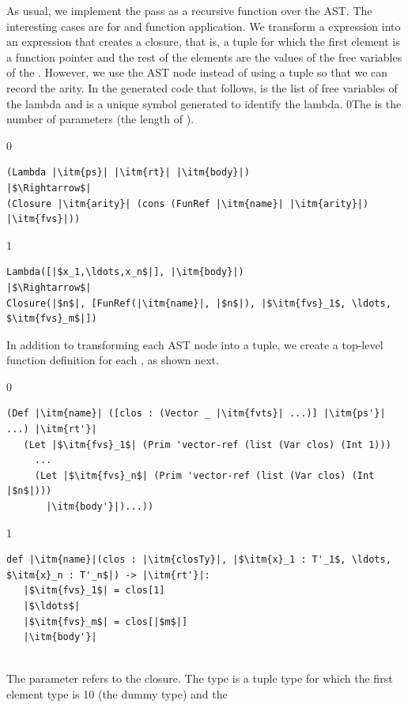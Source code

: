 \documentclass[7x10]{TimesAPriori_MIT}%
\def\racketEd{0}
\def\pythonEd{1}
\def\edition{1}
\newcommand{\racket}[1]{{\if\edition\racketEd{#1}\fi}}
\newcommand{\pythonColor}[0]{}
\newcommand{\python}[1]{{\if\edition\pythonEd\pythonColor #1\fi}}
\numberwithin{theorem}{chapter}
\numberwithin{definition}{chapter}
\numberwithin{equation}{chapter}
\begin{document}
As usual, we implement the pass as a recursive function over the
AST. The interesting cases are for  and function
application. We transform a  expression into an expression
that creates a closure, that is, a tuple for which the first element
is a function pointer and the rest of the elements are the values of
the free variables of the .
%
However, we use the  AST node instead of using a tuple
so that we can record the arity.
%
In the generated code that follows,  is the list of free
variables of the lambda and  is a unique symbol generated to
identify the lambda.
%
\racket{The  is the number of parameters (the length of
  \itm{ps}).}
%
{\if\edition\racketEd
\begin{lstlisting}
(Lambda |\itm{ps}| |\itm{rt}| |\itm{body}|)
|$\Rightarrow$|
(Closure |\itm{arity}| (cons (FunRef |\itm{name}| |\itm{arity}|) |\itm{fvs}|))
\end{lstlisting}
\fi}
%
{\if\edition\pythonEd\pythonColor
\begin{lstlisting}
Lambda([|$x_1,\ldots,x_n$|], |\itm{body}|)
|$\Rightarrow$|
Closure(|$n$|, [FunRef(|\itm{name}|, |$n$|), |$\itm{fvs}_1$, \ldots, $\itm{fvs}_m$|])
\end{lstlisting}
\fi}
%
In addition to transforming each  AST node into a
tuple, we create a top-level function definition for each
, as shown next.\\
\begin{minipage}{0.8\textwidth}
{\if\edition\racketEd
\begin{lstlisting}
(Def |\itm{name}| ([clos : (Vector _ |\itm{fvts}| ...)] |\itm{ps'}| ...) |\itm{rt'}|
   (Let |$\itm{fvs}_1$| (Prim 'vector-ref (list (Var clos) (Int 1)))
     ...
     (Let |$\itm{fvs}_n$| (Prim 'vector-ref (list (Var clos) (Int |$n$|)))
       |\itm{body'}|)...))
\end{lstlisting}
\fi}
{\if\edition\pythonEd\pythonColor
\begin{lstlisting}
def |\itm{name}|(clos : |\itm{closTy}|, |$\itm{x}_1 : T'_1$, \ldots, $\itm{x}_n : T'_n$|) -> |\itm{rt'}|:
   |$\itm{fvs}_1$| = clos[1]
   |$\ldots$|
   |$\itm{fvs}_m$| = clos[|$m$|]
   |\itm{body'}|
\end{lstlisting}
\fi}
\end{minipage}\\
%
The  parameter refers to the closure.  The type
 is a tuple type for which the first element type is
\python{}\racket{\code{\_} (the dummy type)} and the
\end{document}
